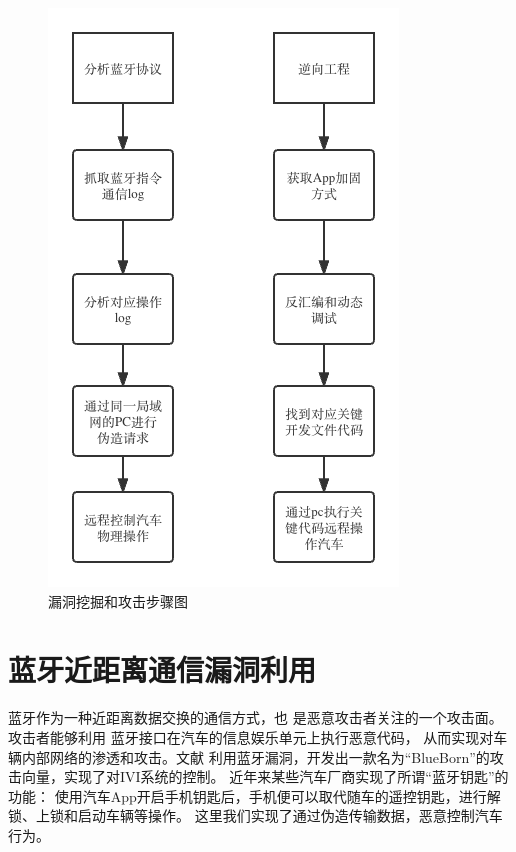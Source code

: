\begin{figure}
  \centering
  \includegraphics[scale=0.5]{resources/img/i23.png}
  \caption{漏洞挖掘和攻击步骤图}
\end{figure}
\newline
\section {蓝牙近距离通信漏洞利用}
蓝牙作为一种近距离数据交换的通信方式，也
是恶意攻击者关注的一个攻击面。攻击者能够利用
蓝牙接口在汽车的信息娱乐单元上执行恶意代码，
从而实现对车辆内部网络的渗透和攻击。文献\cite{antian}
利用蓝牙漏洞，开发出一款名为“BlueBorn”的攻
击向量，实现了对IVI系统的控制。
近年来某些汽车厂商实现了所谓“蓝牙钥匙”的功能：
使用汽车App开启手机钥匙后，手机便可以取代随车的遥控钥匙，进行解锁、上锁和启动车辆等操作。
这里我们实现了通过伪造传输数据，恶意控制汽车行为。
